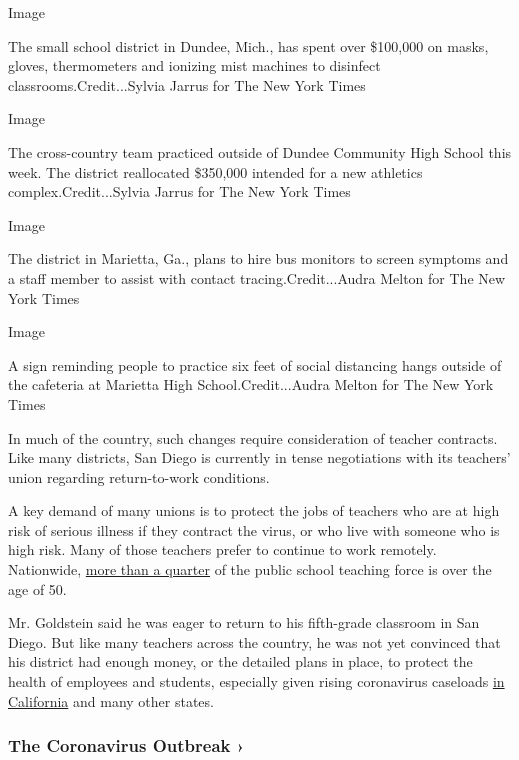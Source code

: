 Image

The small school district in Dundee, Mich., has spent over \$100,000 on
masks, gloves, thermometers and ionizing mist machines to disinfect
classrooms.Credit...Sylvia Jarrus for The New York Times

Image

The cross-country team practiced outside of Dundee Community High School
this week. The district reallocated \$350,000 intended for a new
athletics complex.Credit...Sylvia Jarrus for The New York Times

Image

The district in Marietta, Ga., plans to hire bus monitors to screen
symptoms and a staff member to assist with contact
tracing.Credit...Audra Melton for The New York Times

Image

A sign reminding people to practice six feet of social distancing hangs
outside of the cafeteria at Marietta High School.Credit...Audra Melton
for The New York Times

In much of the country, such changes require consideration of teacher
contracts. Like many districts, San Diego is currently in tense
negotiations with its teachers' union regarding return-to-work
conditions.

A key demand of many unions is to protect the jobs of teachers who are
at high risk of serious illness if they contract the virus, or who live
with someone who is high risk. Many of those teachers prefer to continue
to work remotely. Nationwide,
\href{https://nces.ed.gov/pubs2020/2020142.pdf}{more than a quarter} of
the public school teaching force is over the age of 50.

Mr. Goldstein said he was eager to return to his fifth-grade classroom
in San Diego. But like many teachers across the country, he was not yet
convinced that his district had enough money, or the detailed plans in
place, to protect the health of employees and students, especially given
rising coronavirus caseloads
\href{https://www.nytimes.com/interactive/2020/us/california-coronavirus-cases.html}{in
California} and many other states.

\href{https://www.nytimes.com/news-event/coronavirus?action=click\&pgtype=Article\&state=default\&region=MAIN_CONTENT_3\&context=storylines_faq}{}

\hypertarget{the-coronavirus-outbreak-}{%
\subsubsection{The Coronavirus Outbreak
›}\label{the-coronavirus-outbreak-}}

